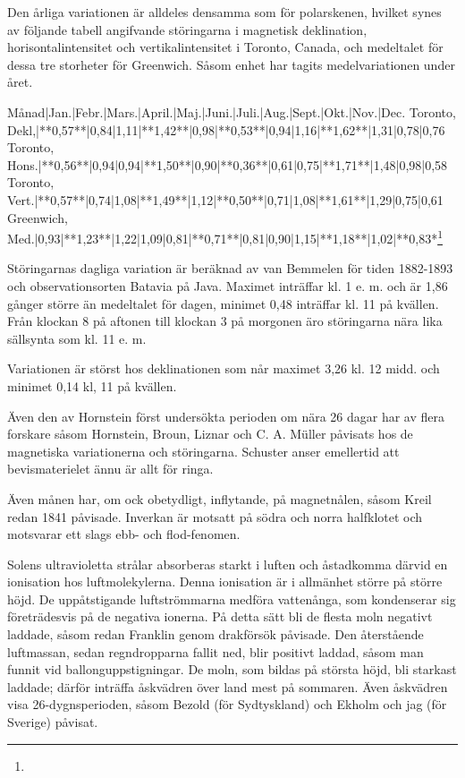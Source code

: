 \documentclass[a4paper, 12pt, oneside, swedish]{article}
\begin{document}
Den årliga variationen är alldeles densamma som för polarskenen, hvilket synes av följande tabell angifvande störingarna i magnetisk deklination, horisontalintensitet och vertikalintensitet i Toronto, Canada, och medeltalet för dessa tre storheter för Greenwich. Såsom enhet har tagits medelvariationen under året.

Månad|Jan.|Febr.|Mars.|April.|Maj.|Juni.|Juli.|Aug.|Sept.|Okt.|Nov.|Dec.  
Toronto, Dekl,|**0,57**|0,84|1,11|**1,42**|0,98|**0,53**|0,94|1,16|**1,62**|1,31|0,78|0,76  
Toronto, Hons.|**0,56**|0,94|0,94|**1,50**|0,90|**0,36**|0,61|0,75|**1,71**|1,48|0,98|0,58  
Toronto, Vert.|**0,57**|0,74|1,08|**1,49**|1,12|**0,50**|0,71|1,08|**1,61**|1,29|0,75|0,61  
Greenwich, Med.|0,93|**1,23**|1,22|1,09|0,81|**0,71**|0,81|0,90|1,15|**1,18**|1,02|**0,83*\footnote{}  

Störingarnas dagliga variation är beräknad av van Bemmelen för tiden 1882-1893 och observationsorten Batavia på Java. Maximet inträffar kl. 1 e. m. och är 1,86 gånger större än medeltalet för dagen, minimet 0,48 inträffar kl. 11 på kvällen. Från klockan 8 på aftonen till klockan 3 på morgonen äro störingarna nära lika sällsynta som kl. 11 e. m.

Variationen är störst hos deklinationen som når maximet 3,26 kl. 12 midd. och minimet 0,14 kl, 11 på kvällen.

Även den av Hornstein först undersökta perioden om nära 26 dagar har av flera forskare såsom Hornstein, Broun, Liznar och C. A. Müller påvisats hos de magnetiska variationerna och störingarna. Schuster anser emellertid att bevismaterielet ännu är allt för ringa.

Även månen har, om ock obetydligt, inflytande, på magnetnålen, såsom Kreil redan 1841 påvisade. Inverkan är motsatt på södra och norra halfklotet och motsvarar ett slags ebb- och flod-fenomen.

Solens ultravioletta strålar absorberas starkt i luften och åstadkomma därvid en ionisation hos luftmolekylerna. Denna ionisation är i allmänhet större på större höjd. De uppåtstigande luftströmmarna medföra vattenånga, som kondenserar sig företrädesvis på de negativa ionerna. På detta sätt bli de flesta moln negativt laddade, såsom redan Franklin genom drakförsök påvisade. Den återstående luftmassan, sedan regndropparna fallit ned, blir positivt laddad, såsom man funnit vid ballonguppstigningar. De moln, som bildas på största höjd, bli starkast laddade; därför inträffa åskvädren över land mest på sommaren. Även åskvädren visa 26-dygnsperioden, såsom Bezold (för Sydtyskland) och Ekholm och jag (för Sverige) påvisat.
\end{document}

